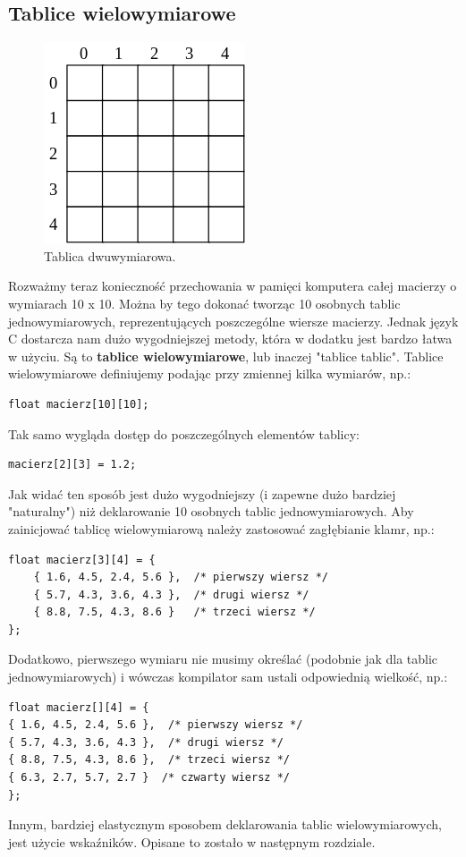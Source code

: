 \documentclass[a4paper,11pt]{article}
\begin{document}
\subsection*{Tablice wielowymiarowe} 
\begin{figure}[!htb]
	\centerline{\includegraphics{Array2}}
	\caption{Tablica dwuwymiarowa.}
	\label{fig:Talbica dwuwymiarowa}
\end{figure}

Rozważmy teraz konieczność przechowania w pamięci komputera całej macierzy o wymiarach 10 x 10. Można by tego dokonać tworząc 10 osobnych tablic jednowymiarowych, reprezentujących poszczególne wiersze macierzy. Jednak język C dostarcza nam dużo wygodniejszej metody, która w dodatku jest bardzo łatwa w użyciu. Są to \textbf{tablice wielowymiarowe}, lub inaczej "tablice tablic". Tablice wielowymiarowe definiujemy podając przy zmiennej kilka wymiarów, np.:
\begin{lstlisting}[caption=Tablice wielowymiarowe, captionpos=b,
label=src:passive2,frame=TB,numbers=none]
float macierz[10][10];
\end{lstlisting}
Tak samo wygląda dostęp do poszczególnych elementów tablicy:
\begin{lstlisting}[caption=Tablice wielowymiarowe, captionpos=b,
label=src:passive2,frame=TB,numbers=none]
macierz[2][3] = 1.2;
\end{lstlisting}
Jak widać ten sposób jest dużo wygodniejszy (i zapewne dużo bardziej "naturalny") niż deklarowanie 10 osobnych tablic jednowymiarowych. Aby zainicjować tablicę wielowymiarową należy zastosować zagłębianie klamr, np.:
\begin{lstlisting}[caption=Tablice wielowymiarowe, captionpos=b,
label=src:passive2,frame=TB,numbers=none]
 float macierz[3][4] = {
	{ 1.6, 4.5, 2.4, 5.6 },  /* pierwszy wiersz */
	{ 5.7, 4.3, 3.6, 4.3 },  /* drugi wiersz */
	{ 8.8, 7.5, 4.3, 8.6 }   /* trzeci wiersz */
};
\end{lstlisting}
Dodatkowo, pierwszego wymiaru nie musimy określać (podobnie jak dla tablic jednowymiarowych) i wówczas kompilator sam ustali odpowiednią wielkość, np.:
\begin{lstlisting}[caption=Tablice wielowymiarowe, captionpos=b,
label=src:passive2,frame=TB,numbers=none]
float macierz[][4] = {
{ 1.6, 4.5, 2.4, 5.6 },  /* pierwszy wiersz */
{ 5.7, 4.3, 3.6, 4.3 },  /* drugi wiersz */
{ 8.8, 7.5, 4.3, 8.6 },  /* trzeci wiersz */
{ 6.3, 2.7, 5.7, 2.7 }  /* czwarty wiersz */
};
\end{lstlisting}
Innym, bardziej elastycznym sposobem deklarowania tablic wielowymiarowych, jest użycie wskaźników. Opisane to zostało w następnym rozdziale.
\end{document}
